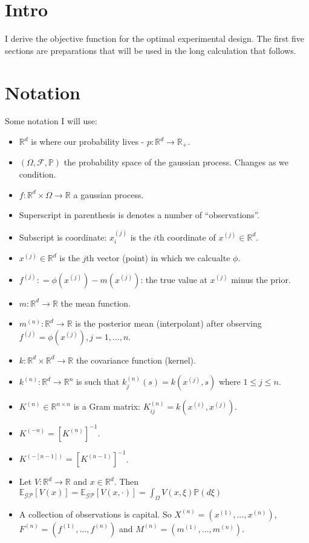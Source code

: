 \documentclass[paper=a4, fontsize=11pt]{scrartcl} %
\numberwithin{equation}{section} %
\numberwithin{figure}{section} %
\numberwithin{table}{section} %
\newcommand{\rr}{\mathbb{R}}
\newcommand{\egp}{\mathbb{E}_{\mathcal{GP}}}
\newcommand{\xn}{x^{(n)}} %
\newcommand{\xj}{x^{(j)}}
\newcommand{\xii}{x^{(i)}}
\newcommand{\Xn}{X^{(n)}}
\newcommand{\mn}{m^{(n)}}
\newcommand{\Mn}{M^{(n)}}
\newcommand{\fn}{f^{(n)}} %
\newcommand{\fj}{f^{(j)}}
\newcommand{\Fn}{F^{(n)}}
\newcommand{\kn}{k^{(n)}}
\newcommand{\Kinvn}{K^{(-n)}} %
\newcommand{\Kinvnm}{K^{(-[n-1])}}
\begin{document}
\section{Intro}
I derive the objective function for the optimal experimental design. The first five sections are preparations that will be used in the
long calculation that follows.

\section{Notation}
Some notation I will use:
\begin{itemize}
 \item $\rr^d$ is where our probability lives - $p :\rr^d \to \rr_{+}$.
 \item $(\Omega, \mathcal{F}, \mathbb{P})$ the probability space of the gaussian process. Changes as we condition.
 \item $f : \rr^d \times \Omega \to \rr$ a gaussian process. 
 \item Superscript in parenthesis is denotes a number of ``observations''. 
 \item Subscript is coordinate: $\xj_i$ is the $i$th coordinate of $\xj \in \rr^d$.
 \item $\xj \in \rr^d$ is the $j$th vector (point) in which we calcualte $\phi$.
 \item $\fj : = \phi ( \xj ) - m(\xj)$: the true value at $\xj$ minus the prior.
 \item $m: \rr ^d \to \rr$ the mean function. 
 \item $\mn: \rr^d \to \rr$ is the posterior mean (interpolant) after observing $\fj = \phi (\xj) , j=1,...,n$.
 \item $k: \rr ^d \times \rr ^d \to \rr$ the covariance function (kernel).
 \item $\kn: \rr^d \to \rr^n$ is such that $\kn_j(s) = k(\xj , s)$ where $1 \leq j \leq n$. 
 \item $K^{(n)} \in \rr^{ n\times n} $ is a Gram matrix: $K^{(n)}_{ij} = k(\xii , \xj)$.
 \item $\Kinvn = [K^{(n)}]^{-1}$.
 \item $\Kinvnm = [K^{(n-1)}]^{-1}$.
 \item Let $V: \rr^d \to \rr$ and $x \in \rr^d$. Then $\egp[ V(x) ]=\egp [V(x, \cdot)] =  \int_{\Omega} V(x, \xi) \mathbb{P}(d\xi) $
 \item A collection of observations is capital. So $\Xn = ( x^{(1)} , ... , \xn )$, $\Fn = (f^{(1)} ,..., \fn)$  and $ \Mn = (m^{(1)} , ..., \mn)$.
\end{itemize}
\end{document}
